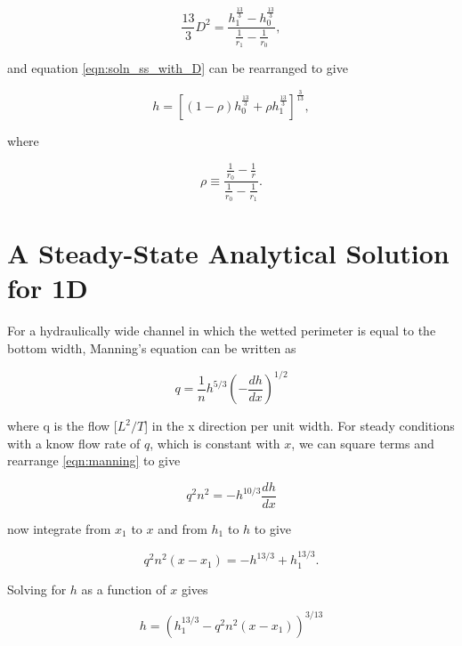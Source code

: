 \documentclass[fleqn]{article}
\begin{document}
\begin{equation}
  \frac{13}{3} D^{2} = \frac{h^{\frac{13}{3}}_{1} - h^{\frac{13}{3}}_{0}}{\frac{1}{r_{1}} - \frac{1}{r_{0}}},
  \label{eqn:D_evaluated}
\end{equation}

\noindent and equation \ref{eqn:soln_ss_with_D} can be rearranged to give

\begin{equation}
  h = \left [ \left (1 - \rho \right ) h^{\frac{13}{3}}_{0} + \rho h^{\frac{13}{3}}_{1} \right ]^{\frac{3}{13}} ,
  \label{eqn:soln_ss}
\end{equation}

\noindent where 

\begin{equation}
  \rho \equiv \frac{\frac{1}{r_{0}} - \frac{1}{r}}{\frac{1}{r_{0}} - \frac{1}{r_{1}}} .
  \label{eqn:rho_defined}
\end{equation}

\section{A Steady-State Analytical Solution for 1D}

For a hydraulically wide channel in which the wetted perimeter is equal to the bottom width, Manning's equation can be written as

\begin{equation}
  q = \frac{1}{n} h^{5/3} \left ( - \frac{dh}{dx} \right )^ {1/2}
  \label{eqn:manning}
\end{equation}

\noindent where q is the flow [$L^2/T$] in the x direction per unit width.  For steady conditions with a know flow rate of $q$, which is constant with $x$, we can square terms and rearrange \ref{eqn:manning} to give 

\begin{equation}
  q^2 n^2 = - h^{10/3} \frac{dh}{dx}
  \label{eqn:manning2}
\end{equation}

\noindent now integrate from $x_1$ to $x$ and from $h_1$ to $h$ to give

\begin{equation}
  q^2 n^2 (x - x_1) = - h^{13/3} + h_1^{13/3}.
  \label{eqn:manning3}
\end{equation}

\noindent Solving for $h$ as a function of $x$ gives

\begin{equation}
  h = \left ( h_1^{13/3} - q^2 n^2 (x - x_1) \right )^{3/13}
  \label{eqn:manning4}
\end{equation}
\end{document}

